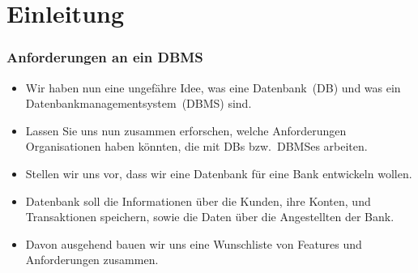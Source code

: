 \documentclass[aspectratio=169,mathserif,notheorems]{beamer}%
\subtitle{3. Anforderungen}%
\begin{document}
%
%
\startPresentation%
%
\section{Einleitung}%
%
\begin{frame}[t]%
\frametitle{Anforderungen an ein DBMS}%
\begin{itemize}%
%
\item Wir haben nun eine ungefähre Idee, was eine Datenbank~(DB) und was ein Datenbankmanagementsystem~(DBMS) sind.%
\item<2-> Lassen Sie uns nun zusammen erforschen, welche Anforderungen Organisationen haben könnten, die mit DBs bzw.\ DBMSes arbeiten.%
\item<3-> Stellen wir uns vor, dass wir eine Datenbank für eine Bank entwickeln wollen.%
\item<4-> Datenbank soll die Informationen über die Kunden, ihre Konten, und Transaktionen speichern, sowie die Daten über die Angestellten der Bank.%
\item<5-> Davon ausgehend bauen wir uns eine Wunschliste von Features und Anforderungen zusammen.%
%
\end{itemize}%
\end{frame}%
%
\end{document}
